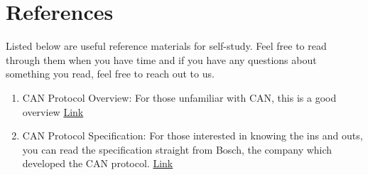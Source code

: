 \documentclass[12pt,letterpaper]{article}
\begin{document}
\section{ References }
    Listed below are useful reference materials for self-study. Feel free to read through them when you have time and if you have any questions about something you read, feel free to reach out to us.  

\begin{enumerate}
    \item CAN Protocol Overview: For those unfamiliar with CAN, this is a good overview \href{https://www.kvaser.com/can-protocol-tutorial/}{Link}
    \item CAN Protocol Specification: For those interested in knowing the ins and outs, you can read the specification straight from Bosch, the company which developed the CAN protocol. \href{http://esd.cs.ucr.edu/webres/can20.pdf}{Link}
\end{enumerate} 
\end{document}
